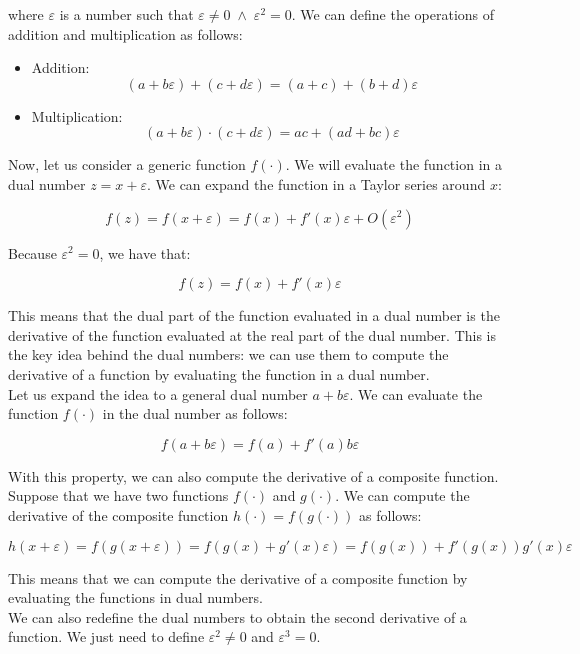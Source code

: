 where $\varepsilon$ is a number such that $\varepsilon \neq 0 \; \wedge \; \varepsilon^2 = 0$. 
We can define the operations of addition and multiplication as follows:

\begin{itemize}
    \item Addition: 
    $$(a + b \varepsilon) + (c + d \varepsilon) = (a + c) + (b + d) \varepsilon$$

    \item Multiplication: 
   $$(a + b \varepsilon) \cdot (c + d \varepsilon) = ac + (ad + bc) \varepsilon$$

\end{itemize}

Now, let us consider a generic function $f(\cdot)$. We will evaluate the function in a 
dual number $z = x + \varepsilon$. We can expand the function in a Taylor series around $x$:

\begin{equation}
    f(z) = f(x + \varepsilon) = f(x) + f'(x) \varepsilon + O(\varepsilon^2)
\end{equation}

Because $\varepsilon^2 = 0$, we have that:

\begin{equation}
    f(z) = f(x) + f'(x) \varepsilon
\end{equation}

This means that the dual part of the function evaluated in a dual number is the derivative of the function
evaluated at the real part of the dual number. This is the key idea behind the dual numbers: we can use them
to compute the derivative of a function by evaluating the function in a dual number.\\

Let us expand the idea to a general dual number $a + b \varepsilon$. We can evaluate the function $f(\cdot)$
in the dual number as follows:

\begin{equation}
    f(a + b \varepsilon) = f(a) + f'(a) b \varepsilon
\end{equation}

With this property, we can also compute the derivative of a composite function. Suppose that we 
have two functions $f(\cdot)$ and $g(\cdot)$. We can compute the derivative of the composite 
function $h(\cdot) = f(g(\cdot))$ as follows:

\begin{equation}
    h(x + \varepsilon) = f(g(x + \varepsilon)) = f(g(x) + g'(x) \varepsilon) = f(g(x)) + f'(g(x)) g'(x) \varepsilon
\end{equation}

This means that we can compute the derivative of a composite function by evaluating the functions 
in dual numbers.\\

We can also redefine the dual numbers to obtain the second derivative of a function. We just need to
define $\varepsilon^2 \neq 0$ and $\varepsilon^3 = 0$. 

